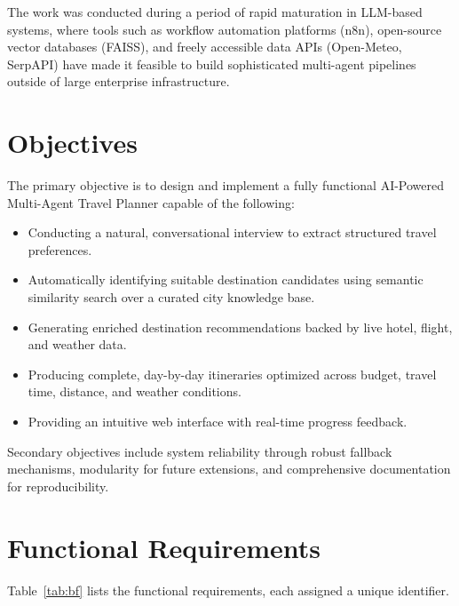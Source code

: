 \documentclass[12pt,a4paper]{report}
\begin{document}
The work was conducted during a period of rapid maturation in LLM-based systems, where tools such as
workflow automation platforms (n8n), open-source vector databases (FAISS), and freely accessible
data APIs (Open-Meteo, SerpAPI) have made it feasible to build sophisticated multi-agent pipelines
outside of large enterprise infrastructure.

\section{Objectives}

The primary objective is to design and implement a fully functional AI-Powered Multi-Agent Travel
Planner capable of the following:

\begin{itemize}
    \item Conducting a natural, conversational interview to extract structured travel preferences.
    \item Automatically identifying suitable destination candidates using semantic similarity search
          over a curated city knowledge base.
    \item Generating enriched destination recommendations backed by live hotel, flight, and weather data.
    \item Producing complete, day-by-day itineraries optimized across budget, travel time, distance,
          and weather conditions.
    \item Providing an intuitive web interface with real-time progress feedback.
\end{itemize}

Secondary objectives include system reliability through robust fallback mechanisms, modularity for
future extensions, and comprehensive documentation for reproducibility.

\section{Functional Requirements}

Table~\ref{tab:bf} lists the functional requirements, each assigned a unique identifier.
\end{document}
